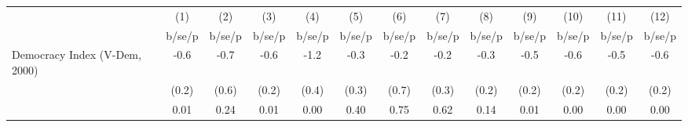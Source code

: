 \begin{tabular}{l*{12}{c}}
\hline\hline
                    &\multicolumn{1}{c}{(1)}&\multicolumn{1}{c}{(2)}&\multicolumn{1}{c}{(3)}&\multicolumn{1}{c}{(4)}&\multicolumn{1}{c}{(5)}&\multicolumn{1}{c}{(6)}&\multicolumn{1}{c}{(7)}&\multicolumn{1}{c}{(8)}&\multicolumn{1}{c}{(9)}&\multicolumn{1}{c}{(10)}&\multicolumn{1}{c}{(11)}&\multicolumn{1}{c}{(12)}\\
                    &      b/se/p&      b/se/p&      b/se/p&      b/se/p&      b/se/p&      b/se/p&      b/se/p&      b/se/p&      b/se/p&      b/se/p&      b/se/p&      b/se/p\\
\hline
Democracy Index (V-Dem, 2000)&        -0.6&        -0.7&        -0.6&        -1.2&        -0.3&        -0.2&        -0.2&        -0.3&        -0.5&        -0.6&        -0.5&        -0.6\\
                    &       (0.2)&       (0.6)&       (0.2)&       (0.4)&       (0.3)&       (0.7)&       (0.3)&       (0.2)&       (0.2)&       (0.2)&       (0.2)&       (0.2)\\
                    &        0.01&        0.24&        0.01&        0.00&        0.40&        0.75&        0.62&        0.14&        0.01&        0.00&        0.00&        0.00\\
\hline\hline
\end{tabular}
